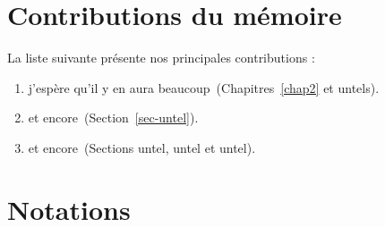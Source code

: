 \section{Contributions du mémoire}
\noindent
La liste suivante présente nos principales contributions :
\vspace{1cm}
\begin{enumerate}
    \item j'espère qu'il y en aura beaucoup~(Chapitres~\ref{chap2} et untels).
    \item et encore~(Section~\ref{sec-untel}).
    \item et encore~(Sections untel, untel et untel).
\end{enumerate}

\clearpage
\section{Notations}